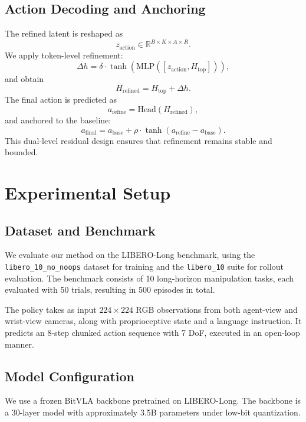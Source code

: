 \documentclass[conference]{IEEEtran}
\begin{document}
\subsection{Action Decoding and Anchoring}
The refined latent is reshaped as
\begin{equation}
z_{\text{action}} \in \mathbb{R}^{B \times K \times A \times R}.
\end{equation}
We apply token-level refinement:
\begin{equation}
\Delta h = \delta \cdot \tanh(\text{MLP}([z_{\text{action}}, H_{\text{top}}])),
\end{equation}
and obtain
\begin{equation}
H_{\text{refined}} = H_{\text{top}} + \Delta h.
\end{equation}
The final action is predicted as
\begin{equation}
a_{\text{refine}} = \text{Head}(H_{\text{refined}}),
\end{equation}
and anchored to the baseline:
\begin{equation}
a_{\text{final}} = a_{\text{base}} + \rho \cdot \tanh(a_{\text{refine}} - a_{\text{base}}).
\end{equation}
This dual-level residual design ensures that refinement remains stable and bounded.


\section{Experimental Setup}
\subsection{Dataset and Benchmark}
We evaluate our method on the LIBERO-Long benchmark, using the \texttt{libero\_10\_no\_noops} dataset for training and the \texttt{libero\_10} suite for rollout evaluation. The benchmark consists of 10 long-horizon manipulation tasks, each evaluated with 50 trials, resulting in 500 episodes in total.

The policy takes as input $224 \times 224$ RGB observations from both agent-view and wrist-view cameras, along with proprioceptive state and a language instruction. It predicts an 8-step chunked action sequence with 7 DoF, executed in an open-loop manner.

\subsection{Model Configuration}
We use a frozen BitVLA backbone pretrained on LIBERO-Long. The backbone is a 30-layer model with approximately 3.5B parameters under low-bit quantization.
\end{document}
